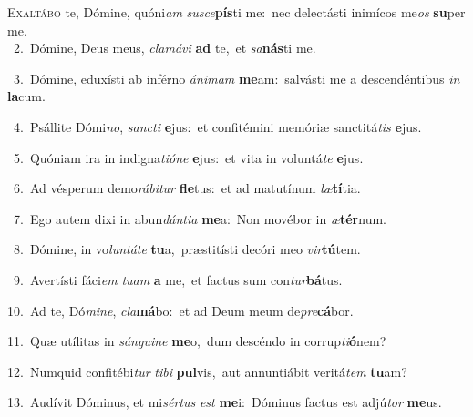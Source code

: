 \lettrine{\initial\textcolor{\initialcolor}{E}}{xaltábo} te, Dómine, quóni\textit{am} \textit{su}\-\textit{sce}\textbf{pís}ti me:~\star nec delectásti inimícos me\textit{os} \textbf{su}\-per me.\\
{\numbfont\textcolor{\numbcolor}{~2.}}~Dómine, Deus meus, \textit{cla}\-\textit{má}\textit{vi} \textbf{ad} te,~\star et \textit{sa}\-\textbf{nás}ti me.\par
{\numbfont\textcolor{\numbcolor}{~3.}}~Dómine, eduxísti ab inférno \textit{á}\-\textit{ni}\textit{mam} \textbf{me}\-am:~\star salvásti me a descendéntibus \textit{in} \textbf{la}\-cum.\par
{\numbfont\textcolor{\numbcolor}{~4.}}~Psállite Dómi\-\textit{no}\-, \textit{sanc}\-\textit{ti} \textbf{e}\-jus:~\star et confitémini memóriæ sanctitá\textit{tis} \textbf{e}\-jus.\par
{\numbfont\textcolor{\numbcolor}{~5.}}~Quóniam ira in indigna\-\textit{ti}\-\textit{ó}\textit{ne} \textbf{e}\-jus:~\star et vita in voluntá\textit{te} \textbf{e}\-jus.\par
{\numbfont\textcolor{\numbcolor}{~6.}}~Ad vésperum demo\-\textit{rá}\-\textit{bi}\textit{tur} \textbf{fle}\-tus:~\star et ad matutínum \textit{læ}\-\textbf{tí}tia.\par
{\numbfont\textcolor{\numbcolor}{~7.}}~Ego autem dixi in abun\-\textit{dán}\-\textit{ti}\textit{a} \textbf{me}\-a:~\star Non movébor in \textit{æ}\-\textbf{tér}num.\par
{\numbfont\textcolor{\numbcolor}{~8.}}~Dómine, in vo\-\textit{lun}\-\textit{tá}\textit{te} \textbf{tu}\-a,~\star præstitísti decóri meo \textit{vir}\-\textbf{tú}tem.\par
{\numbfont\textcolor{\numbcolor}{~9.}}~Avertísti fáci\textit{em} \textit{tu}\-\textit{am} \textbf{a} me,~\star et factus sum con\-\textit{tur}\-\textbf{bá}tus.\par
{\numbfont\textcolor{\numbcolor}{10.}}~Ad te, Dó\-\textit{mi}\-\textit{ne}, \textit{cla}\-\textbf{má}bo:~\star et ad Deum meum de\-\textit{pre}\-\textbf{cá}bor.\par
{\numbfont\textcolor{\numbcolor}{11.}}~Quæ utílitas in \textit{sán}\-\textit{gui}\textit{ne} \textbf{me}\-o,~\star dum descéndo in corrup\-\textit{ti}\-\textbf{ó}nem?\par
{\numbfont\textcolor{\numbcolor}{12.}}~Numquid confitébi\textit{tur} \textit{ti}\-\textit{bi} \textbf{pul}\-vis,~\star aut annuntiábit veritá\textit{tem} \textbf{tu}\-am?\par
{\numbfont\textcolor{\numbcolor}{13.}}~Audívit Dóminus, et mi\-\textit{sér}\-\textit{tus} \textit{est} \textbf{me}\-i:~\star Dóminus factus est adjú\textit{tor} \textbf{me}\-us.\par
